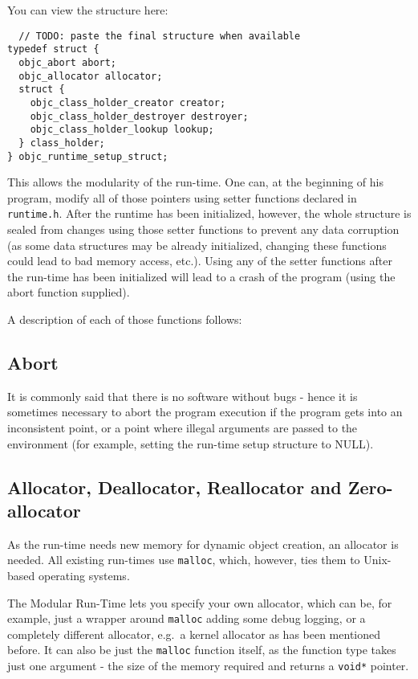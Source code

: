 You can view the structure here:

\begin{verbatim}
  // TODO: paste the final structure when available
typedef struct {
  objc_abort abort;
  objc_allocator allocator;
  struct {
    objc_class_holder_creator creator;
    objc_class_holder_destroyer destroyer;
    objc_class_holder_lookup lookup;
  } class_holder;
} objc_runtime_setup_struct;
\end{verbatim}

This allows the modularity of the run-time. One can, at the beginning of his program, modify all of those pointers using setter functions declared in \verb=runtime.h=. After the runtime has been initialized, however, the whole structure is sealed from changes using those setter functions to prevent any data corruption (as some data structures may be already initialized, changing these functions could lead to bad memory access, etc.). Using any of the setter functions after the run-time has been initialized will lead to a crash of the program (using the abort function supplied).

A description of each of those functions follows:

\subsection{Abort}

It is commonly said that there is no software without bugs - hence it is sometimes necessary to abort the program execution if the program gets into an inconsistent point, or a point where illegal arguments are passed to the environment (for example, setting the run-time setup structure to NULL).

\subsection{Allocator, Deallocator, Reallocator and Zero-allocator}

As the run-time needs new memory for dynamic object creation, an allocator is needed. All existing run-times use \verb=malloc=, which, however, ties them to Unix-based operating systems.

The Modular Run-Time lets you specify your own allocator, which can be, for example, just a wrapper around \verb=malloc= adding some debug logging, or a completely different allocator, e.g.\ a kernel allocator as has been mentioned before. It can also be just the \verb=malloc= function itself, as the function type takes just one argument - the size of the memory required and returns a \verb=void*= pointer.

